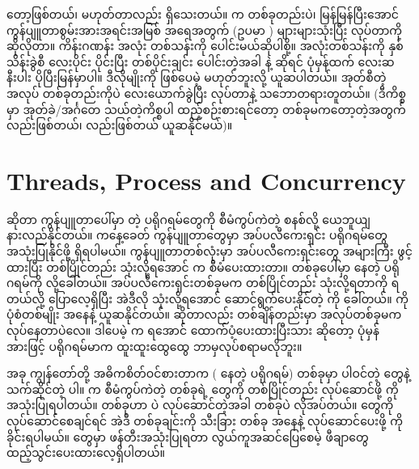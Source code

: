  တော့ဖြစ်တယ်၊   မဟုတ်တာလည်း ရှိသေးတယ်။  က တစ်ခုတည်းပဲ၊ မြန်မြန်ပြီးအောင် ကွန်ပျူတာစွမ်းအားအရင်းအမြစ် အရေအတွက် (ဥပမာ ) များများသုံးပြီး လုပ်တာကို ဆိုလိုတာ။ ကိန်းဂဏန်း အလုံး တစ်သန်းကို ပေါင်းမယ်ဆိုပါစို့။ အလုံးတစ်သန်းကို နှစ်သိန်းခွဲစီ လေးပိုင်း ပိုင်းပြီး တစ်ပိုင်းချင်း ပေါင်းတဲ့အခါ  နဲ့ ဆိုရင် ပုံမှန်ထက် လေးဆနီးပါး ပိုပြီးမြန်မှာပါ။ ဒီလိုမျိုးကို  ဖြစ်ပေမဲ့  မဟုတ်ဘူးလို့ ယူဆပါတယ်။ အုတ်စီတဲ့အလုပ် တစ်ခုတည်းကိုပဲ လေးယောက်ခွဲပြီး လုပ်တာနဲ့ သဘောတရားတူတယ်။ (ဒီကိစ္စမှာ အုတ်ခဲ/အင်္ဂတေ သယ်တဲ့ကိစ္စပါ ထည့်စဉ်းစားရင်တော့  တစ်ခုမကတော့တဲ့အတွက်  လည်းဖြစ်တယ်၊  လည်းဖြစ်တယ် ယူဆနိုင်မယ်)။

\section{Threads, Process and Concurrency}
 ဆိုတာ ကွန်ပျူတာပေါ်မှာ  တဲ့ ပရိုဂရမ်တွေကို စီမံကွပ်ကဲတဲ့ စနစ်လို့ ယေဘူ\allowbreak ယျ နားလည်နိုင်တယ်။ ကနေ့ခေတ် ကွန်ပျူတာတွေမှာ အပ်ပလီကေးရှင်း ပရိုဂရမ်တွေ အသုံးပြုနိုင်ဖို့  ရှိရပါမယ်။ ကွန်ပျူတာတစ်လုံးမှာ အပ်ပလီကေးရှင်းတွေ အများကြီး ဖွင့်ထားပြီး တစ်ပြိုင်တည်း သုံးလို့ရအောင်  က စီမံပေးထားတာ။  တစ်ခုပေါ်မှာ  နေတဲ့ ပရိုဂရမ်ကို  လို့ခေါ်တယ်။ အပ်ပလီကေးရှင်းတစ်ခုမက တစ်ပြိုင်တည်း သုံးလို့ရတာကို  ရတယ်လို့ ပြောလေ့ရှိပြီး အဲဒီလို သုံးလို့ရအောင် ဆောင်ရွက်ပေးနိုင်တဲ့  ကို  ခေါ်တယ်။  ကို  ပုံစံတစ်မျိုး အနေနဲ့ ယူဆနိုင်တယ်။  ဆိုတာလည်း တစ်ချိန်တည်းမှာ အလုပ်တစ်ခုမက လုပ်နေတာပဲလေ။ ဒါပေမဲ့  က  ရအောင် ထောက်ပံ့ပေးထားပြီးသား ဆိုတော့ ပုံမှန်အားဖြင့် ပရိုဂရမ်မာက ထူးထူးထွေထွေ ဘာမှလုပ်စရာမလိုဘူး။


အခု ကျွန်တော်တို့ အဓိကစိတ်ဝင်စားတာက  ( နေတဲ့ ပရိုဂရမ်) တစ်ခုမှာ ပါဝင်တဲ့  တွေနဲ့ သက်ဆိုင်တဲ့  ပါ။  က စီမံကွပ်ကဲတဲ့  တစ်ခုရဲ့  တွေကို တစ်ပြိုင်တည်း လုပ်ဆောင်ဖို့  ကို အသုံးပြုရပါတယ်။  တစ်ခုဟာ  ပဲ လုပ်ဆောင်တဲ့အခါ  တစ်ခုပဲ လိုအပ်တယ်။  တွေကို  လုပ်ဆောင်စေချင်ရင် အဲဒီ  တစ်ခုချင်းကို  သီးခြား  တစ်ခု အနေနဲ့ လုပ်ဆောင်ပေးဖို့  ကို ခိုင်းရပါမယ်။  တွေမှာ  ဖန်တီးအသုံးပြုရတာ လွယ်ကူအဆင်ပြေစေမဲ့ ဖီချာတွေ ထည့်သွင်းပေးထားလေ့ရှိပါတယ်။

